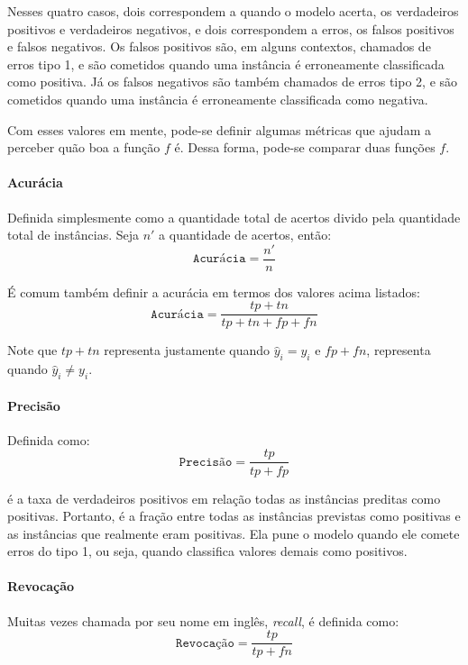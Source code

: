 Nesses quatro casos, dois correspondem a quando o modelo acerta, os verdadeiros
positivos e verdadeiros negativos, e dois correspondem a erros, os falsos
positivos e falsos negativos. Os falsos positivos são, em alguns contextos,
chamados de erros tipo 1, e são cometidos quando uma instância é erroneamente
classificada como positiva. Já os falsos negativos são também chamados de erros
tipo 2, e são cometidos quando uma instância é erroneamente classificada como
negativa.

Com esses valores em mente, pode-se definir algumas métricas que ajudam a
perceber quão boa a função $f$ é. Dessa forma, pode-se comparar duas funções
$f$.

\paragraph{Acurácia}%
\label{par:acuracia}

Definida simplesmente como a quantidade total de acertos divido pela quantidade
total de instâncias. Seja $n'$ a quantidade de acertos, então:
\[
\texttt{Acurácia} = \dfrac{n'}{n}
\]

É comum também definir a acurácia em termos dos valores acima listados:
\[
\texttt{Acurácia} = \dfrac{tp+tn}{tp+tn+fp+fn}
\]

Note que $tp+tn$ representa justamente quando $\hat{y}_i=y_i$ e $fp+fn$,
representa quando $\hat{y}_i\neq y_i$.

\paragraph{Precisão}%
\label{par:precisao}

Definida como:
\[
\texttt{Precisão} = \dfrac{tp}{tp+fp}
\]

é a taxa de verdadeiros positivos em relação todas as instâncias preditas como
positivas. Portanto, é a fração entre todas as instâncias previstas como
positivas e as instâncias que realmente eram positivas. Ela pune o modelo quando
ele comete erros do tipo 1, ou seja, quando classifica valores demais como
positivos.

\paragraph{Revocação}%
\label{par:revocacao}

Muitas vezes chamada por seu nome em inglês, \textit{recall}, é definida como:
\[
\texttt{Revocação} = \dfrac{tp}{tp+fn}
\]

